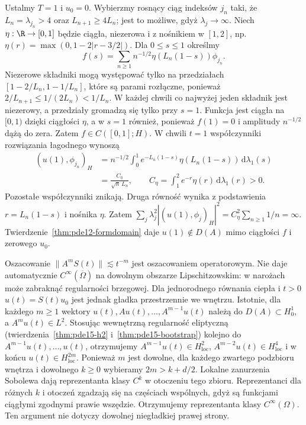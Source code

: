 \begin{kontrprzyklad}
Ustalmy $T=1$ i $u_0=0$. Wybierzmy rosnący ciąg indeksów
$j_n$ taki, że $L_n=\lambda_{j_n}>4$ oraz
$L_{n+1}\ge4L_n$; jest to możliwe, gdyż $\lambda_j\to\infty$.
Niech $\eta:\R\to[0,1]$ będzie ciągła, niezerowa i z nośnikiem
w $[1,2]$, np. $\eta(r)=\max(0,1-2|r-3/2|)$.
Dla $0\le s\le1$ określmy
\[
 f(s)=\sum_{n\ge1}n^{-1/2}\eta(L_n(1-s))\phi_{j_n}.
\]
Niezerowe składniki mogą występować tylko na przedziałach
$[1-2/L_n,1-1/L_n]$, które są parami rozłączne,
ponieważ $2/L_{n+1}\le1/(2L_n)<1/L_n$.
W każdej chwili co najwyżej jeden składnik jest niezerowy,
a przedziały gromadzą się tylko przy $s=1$.
Funkcja jest ciągła na $[0,1)$ dzięki ciągłości $\eta$,
a w $s=1$ również, ponieważ $f(1)=0$ i amplitudy
$n^{-1/2}$ dążą do zera. Zatem $f\in C([0,1];H)$.
W chwili $t=1$ współczynniki rozwiązania łagodnego wynoszą
\[
 \begin{aligned}
 (u(1),\phi_{j_n})_H
 &=n^{-1/2}\int_0^1 e^{-L_n(1-s)}
 \eta(L_n(1-s))\,\mathrm d\lambda_1(s)\\
 &=\frac{C_\eta}{\sqrt n\,L_n},
 \qquad
 C_\eta=\int_1^2 e^{-r}\eta(r)\,\mathrm d\lambda_1(r)>0 .
 \end{aligned}
\]
Pozostałe współczynniki znikają. Druga równość wynika
z podstawienia $r=L_n(1-s)$ i nośnika $\eta$.
Zatem $\sum_j\lambda_j^2|(u(1),\phi_j)_H|^2
=C_\eta^2\sum_{n\ge1}1/n=\infty$.
Twierdzenie~\ref{thm:pde12-formdomain} daje
$u(1)\notin D(A)$ mimo ciągłości $f$ i zerowego $u_0$.
\end{kontrprzyklad}

\begin{uwaga}
Oszacowanie $\|A^mS(t)\|\lesssim t^{-m}$ jest
oszacowaniem operatorowym. Nie daje automatycznie
$C^\infty(\overline\Omega)$ na dowolnym obszarze Lipschitzowskim: w narożach może zabraknąć regularności
brzegowej. Dla jednorodnego równania ciepła i $t>0$
$u(t)=S(t)u_0$ jest jednak gładka przestrzennie we wnętrzu.
Istotnie, dla każdego $m\ge1$ wektory $u(t),Au(t),\ldots,
A^{m-1}u(t)$ należą do $D(A)\subset H_0^1$,
a $A^mu(t)\in L^2$. Stosując wewnętrzną regularność
eliptyczną (twierdzenia~\ref{thm:pde15-h2}
i~\ref{thm:pde15-bootstrap}) kolejno do
$A^{m-1}u(t),\ldots,u(t)$, otrzymujemy
$A^{m-1}u(t)\in H^2_{\mathrm{loc}}$,
$A^{m-2}u(t)\in H^4_{\mathrm{loc}}$ i w końcu
$u(t)\in H^{2m}_{\mathrm{loc}}$.
Ponieważ $m$ jest dowolne, dla każdego zwartego
podzbioru wnętrza i dowolnego $k\ge0$ wybieramy
$2m>k+d/2$. Lokalne zanurzenia Sobolewa dają
reprezentanta klasy $C^k$ w otoczeniu tego zbioru.
Reprezentanci dla różnych $k$ i otoczeń zgadzają się
na częściach wspólnych, gdyż są funkcjami ciągłymi
zgodnymi prawie wszędzie. Otrzymujemy reprezentanta klasy $C^\infty(\Omega)$.
Ten argument nie dotyczy dowolnej niegładkiej prawej strony.
\end{uwaga}

